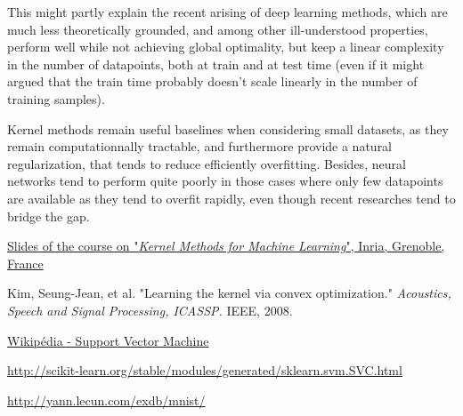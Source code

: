 \documentclass[a4paper, 11pt]{article}
\begin{document}
This might partly explain the recent arising of deep learning methods, which
are much less theoretically grounded, and among other ill-understood properties,
perform well while not achieving global optimality, but keep a linear complexity
in the number of datapoints, both at train and at test time (even if it might argued
that the train time probably doesn't scale linearly in the number of training samples).

Kernel methods remain useful baselines when considering small datasets, as
they remain computationnally tractable, and furthermore
provide a natural regularization, that tends to reduce efficiently overfitting.
Besides, neural networks tend to perform quite poorly in those cases where only 
few datapoints are available as they tend to overfit rapidly, even though recent
researches tend to bridge the gap.

\begin{thebibliography}{1}

 \href{http://lear.inrialpes.fr/people/mairal/teaching/2015-2016/MVA/fichiers/mva_slides.pdf}{Slides of the course on "{\it Kernel Methods for Machine Learning}", Inria, Grenoble, France}

 Kim, Seung-Jean, et al. "Learning the kernel via convex optimization." {\it Acoustics, Speech and Signal Processing, ICASSP.} IEEE, 2008.

 \href{https://en.wikipedia.org/wiki/Support_vector_machine}{Wikip\'edia - Support Vector Machine}

 \href{Library {\it sklearn} for Machine Learning in Python. Functions on SVM/SVC.}{http://scikit-learn.org/stable/modules/generated/sklearn.svm.SVC.html}

 \href{The MNIST Databse of handwritten digits. (Website of Yann Lecun)}{http://yann.lecun.com/exdb/mnist/}

\end{thebibliography}
\end{document}
